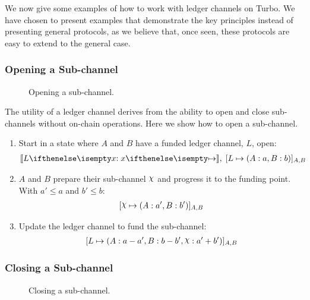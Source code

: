 We now give some examples of how to work with ledger channels on Turbo.
We have chosen to present examples that demonstrate the key principles instead of presenting general protocols, as we believe that, once seen, these protocols are easy to extend to the general case.

\subsubsection{Opening a Sub-channel}

\begin{figure}[h]\centering
  \makebox[\textwidth][c]{}
  \caption{
    Opening a sub-channel.
  }\label{fig:opening-sub-channel}
\end{figure}

The utility of a ledger channel derives from the ability to open and close sub-channels without on-chain operations.
Here we show how to open a sub-channel.
\begin{enumerate}
  \item Start in a state where $A$ and $B$ have a funded ledger channel, $L$, open:
  \begin{align}
    \adj{\holds{L}{x}{}}, \; \finalizable{L}{\alloc{A: a, B: b}}{A, B}
  \end{align}
  \item $A$ and $B$ prepare their sub-channel $\rchi$ and progress it to the funding point. With $a' \leq a$ and $b' \leq b$:
  \begin{align}
    \finalizable{\rchi}{\alloc{A:a', B:b'}}{A,B}
  \end{align}
  \item Update the ledger channel to fund the sub-channel:
  \begin{align}
    \finalizable{L}{\alloc{A:a-a', B: b - b', \rchi: a' + b'}}{A,B}
  \end{align}
\end{enumerate}

\subsubsection{Closing a Sub-channel}

\begin{figure}[h]\centering
  \makebox[\textwidth][c]{}
  \caption{
    Closing a sub-channel.
  }\label{fig:closing-sub-channel}
\end{figure}

